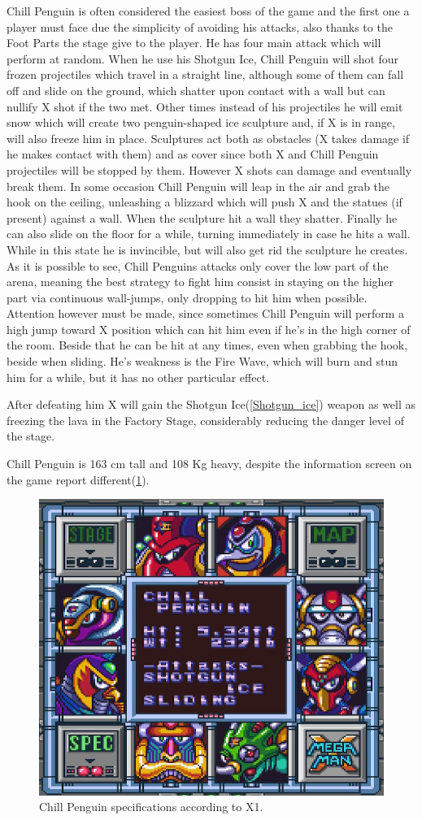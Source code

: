 Chill Penguin is often considered the easiest boss of the game and the first one a player must face due the simplicity of avoiding his attacks, also thanks to the Foot Parts the stage give to the player. He has four main attack which will perform at random\cite{wiki:Chill_Penguin}. When he use his Shotgun Ice, Chill Penguin will shot four frozen projectiles which travel in a straight line, although some of them  can fall off and slide on the ground, which shatter upon contact with a wall but can nullify X shot if the two met. Other times instead of his projectiles he will emit snow which will create two penguin-shaped ice sculpture and, if X is in range, will also freeze him in place. Sculptures act both as obstacles (X takes damage if he makes contact with them) and as cover since both X and Chill Penguin projectiles will be stopped by them. However X shots can damage and eventually break them. In some occasion Chill Penguin will leap in the air and grab the hook on the ceiling, unleashing a blizzard which will push X and the statues (if present) against a wall. When the sculpture hit a wall they shatter. Finally he can also slide on the floor for a while, turning immediately in case he hits a wall. While in this state he is invincible, but will also get rid the sculpture he creates.  As it is possible to see, Chill Penguins attacks only cover the low part of the arena, meaning the best strategy to fight him consist in staying on the higher part via continuous wall-jumps, only dropping to hit him when possible. Attention however must be made, since sometimes Chill Penguin will perform a high jump toward X position which can hit him even if he's  in the high corner of the room. Beside that he can be hit at any times, even when grabbing the hook, beside when sliding. He's weakness is the Fire Wave, which will burn and stun him for a while, but it has no other particular effect.


After defeating him X will gain the Shotgun Ice(\ref{Shotgun_ice}) weapon as well as freezing the lava in the Factory Stage, considerably reducing the danger level of the stage.

Chill Penguin is 163 cm tall and 108 Kg heavy, despite the information screen on the game report different(\ref{Penguin_specs}).

\begin{figure}[h]
	\centering
	\includegraphics[width=0.5\linewidth]{figures/X1/Chill_penguin/Chill_penguin_specs.jpg}
	\caption{Chill Penguin specifications according to X1.}
	\label{Penguin_specs}
\end{figure}

